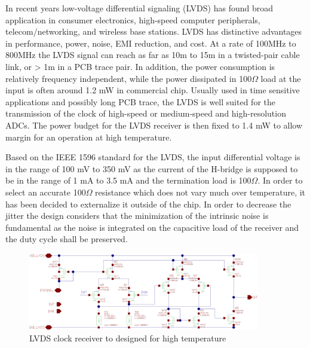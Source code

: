 In recent years low-voltage differential signaling (LVDS) has found broad application in consumer electronics, high-speed computer peripherals, telecom/networking, and wireless base stations. LVDS has distinctive advantages in performance, power, noise, EMI reduction, and cost. At a rate of 100MHz to 800MHz the LVDS signal can reach as far as 10m to 15m in a twisted-pair cable link, or > 1m in a PCB trace pair. In addition, the power consumption is relatively frequency independent, while the power dissipated in 100$\Omega$ load at the input is often around 1.2 mW in commercial chip. Usually used in time sensitive applications and possibly long PCB trace, the LVDS is well suited for the transmission of the clock of high-speed or medium-speed and high-resolution ADCs. The power budget for the LVDS receiver is then fixed to 1.4 mW to allow margin for an operation at high temperature.

Based on the IEEE 1596 standard for the LVDS, the input differential voltage is in the range of 100 mV to 350 mV as the current of the H-bridge is supposed to be in the range of 1 mA to 3.5 mA and the termination load is 100$\Omega$. In order to select an accurate 100$\Omega$ resistance which does not vary much over temperature, it has been decided to externalize it outside of the chip. In order to decrease the jitter the design considers that the minimization of the intrinsic noise is fundamental as the noise is integrated on the capacitive load of the receiver and the duty cycle shall be preserved. 

\begin{figure}[htp]
    \centering
    \includegraphics[width=0.9\textwidth]{Chapter5/Figs/adc_chip/clk-recovery.png}
    \caption{LVDS clock receiver to designed for high temperature}
    \label{fig:lvds-receiver}
\end{figure}


